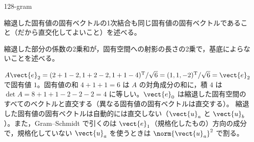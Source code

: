 \documentclass[uplatex,dvipdfmx,a4paper,11pt]{jsarticle}
\begin{document}
\begin{kaisetsu}{128-gram}
\begin{ronten}
  \item {} 縮退した固有値の固有ベクトルの1次結合も同じ固有値の固有ベクトルであること（だから直交化してよいこと）を述べる。
  \item {} 縮退した部分の係数の2乗和が，固有空間への射影の長さの2乗で，基底によらないことを述べる。
\end{ronten}
\kenzan $A\vect{e}_{2}=(2+1-2,1+2-2,1+1-4)^{\mathrm{T}}/\sqrt{6}=(1,1,-2)^{\mathrm{T}}/\sqrt{6}=\vect{e}_{2}$ で固有値 $1$。固有値の和 $4+1+1=6$ は $A$ の対角成分の和に，積 $4$ は $\det A=8+1+1-2-2-2=4$ に等しい。$\vect{e}_{0}$ は縮退した固有空間のすべてのベクトルと直交する（異なる固有値の固有ベクトルは直交する）。
\tsumazuki 縮退した固有値の固有ベクトルは自動的には直交しない（$\vect{u}_{a}$ と $\vect{u}_{b}$）。また，Gram--Schmidt で引くのは $\vect{e}_{1}$（規格化したもの）方向の成分で，規格化していない $\vect{u}_{a}$ を使うときは $\norm{\vect{u}_{a}}^{2}$ で割る。
\end{kaisetsu}
\end{document}
